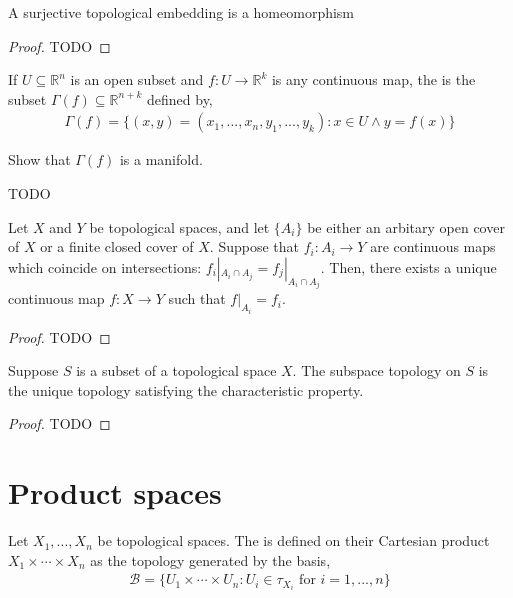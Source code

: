 \begin{proposition}
	A surjective topological embedding is a homeomorphism
	\begin{proof}
		TODO
	\end{proof}
\end{proposition}

\begin{definition}
	If $ U \subseteq \mathbb{R}^{n} $ is an open subset and $ f:U \to \mathbb{R}^{k} $ is any continuous map, the  is the subset $ \Gamma ( f )\subseteq \mathbb{R}^{n+k} $ defined by,
	\begin{align*}
		\Gamma ( f ) = \{ ( x,y ) = ( x_{1},...,x_{n},y_{1},...,y_{k} ): x \in U \land y = f ( x ) \}
	\end{align*}
\end{definition}

\begin{exercise}
	\begin{problem}
	Show that $ \Gamma ( f ) $ is a manifold.
	\end{problem}
	\begin{solution}
		TODO
	\end{solution}
\end{exercise}

\begin{lemma}
	Let $ X $ and $ Y $ be topological spaces, and let $ \{ A_{i} \} $ be either an arbitary open cover of $ X $ or a finite closed cover of $ X $. Suppose that $ f_{i}:A_{i}\to Y $ are continuous maps which coincide on intersections: $ f_{i}|_{A_{i}\cap A_{j}} = f_{j}|_{A_{i}\cap A_{j}} $. Then, there exists a unique continuous map $ f:X \to Y $ such that $ f|_{A_{i}} = f_{i} $.
	\begin{proof}
		TODO
	\end{proof}
\end{lemma}

\begin{theorem}
	Suppose $ S $ is a subset of a topological space $ X $. The subspace topology on $ S $ is the unique topology satisfying the characteristic property.
	\begin{proof}
		TODO
	\end{proof}
\end{theorem}

\section{Product spaces}
\begin{definition}
	Let $ X_{1},...,X_{n} $ be topological spaces. The  is defined on their Cartesian product $ X_{1}\times \cdots \times X_{n} $ as the topology generated by the basis,
	\begin{align*}
		\mathcal{B} = \{ U_{1}\times \cdots \times U_{n}: U_{i} \in \tau_{X_{i}} \text{ for } i = 1,...,n \}
	\end{align*}
\end{definition}

